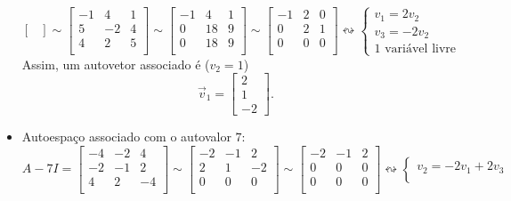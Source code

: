 \documentclass[../livro.tex]{subfiles}
\begin{document}
\begin{example}
\begin{itemize}
\[\begin{bmatrix}
		\end{bmatrix} \sim
		\begin{bmatrix}
		-1 & 4 & 1 \\
		5 & -2 & 4 \\  
		4 & 2 & 5 \\
		\end{bmatrix} \sim 
		\begin{bmatrix}
		-1 & 4 & 1 \\
		0 & 18 & 9 \\  
		0 & 18 & 9 \\
		\end{bmatrix} \sim
		\begin{bmatrix}
		-1 & 2 & 0 \\
		0 &  2 & 1 \\  
		0 &  0 & 0 \\
		\end{bmatrix} \leftrightsquigarrow
		\left\lbrace 
		\begin{array}{l}
		v_1 = 2 v_2 \\
		v_3 = - 2 v_2 \\
		\text{1 variável livre}
		\end{array}
		\right. 
		\] Assim, um autovetor associado é ($v_2 = 1$)
		\[
		\vec{v}_1 = 
		\begin{bmatrix}
		2 \\ 1 \\ -2
		\end{bmatrix}.
		\]
		\item Autoespaço associado com o autovalor $7$:
		\[
		A - 7 I = 
		\begin{bmatrix}
		-4 & -2 & 4 \\  
		-2 & -1 & 2 \\
		4 & 2 & -4 \\
		\end{bmatrix} \sim
		\begin{bmatrix}
		-2 & -1 & 2 \\
		2 & 1 & -2 \\  
		0 & 0 & 0 \\
		\end{bmatrix} \sim 
		\begin{bmatrix}
		-2 & -1 & 2 \\
		0 & 0 & 0 \\  
		0 & 0 & 0 \\
		\end{bmatrix} \leftrightsquigarrow
		\left\lbrace 
		\begin{array}{l}
		v_2 = - 2 v_1 + 2 v_3  \\

\end{array}\]
\end{itemize}
\end{example}
\end{document}

